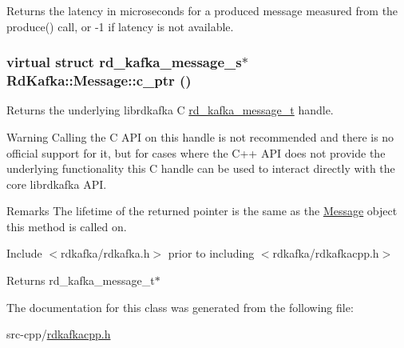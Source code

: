 \label{classRdKafka_1_1Message_a8cce832cbab290d193b028ca3f689b07}
\begin{DoxyReturn}{Returns}
the latency in microseconds for a produced message measured from the produce() call, or -\/1 if latency is not available. 
\end{DoxyReturn}
\hypertarget{classRdKafka_1_1Message_a6add1e2620c7ac4283f150e48cb6e53e}{
\subsubsection[{c\_\-ptr}]{\setlength{\rightskip}{0pt plus 5cm}virtual struct rd\_\-kafka\_\-message\_\-s$\ast$ RdKafka::Message::c\_\-ptr ()}}
\label{classRdKafka_1_1Message_a6add1e2620c7ac4283f150e48cb6e53e}


Returns the underlying librdkafka C \hyperlink{structrd__kafka__message__t}{rd\_\-kafka\_\-message\_\-t} handle. \begin{DoxyWarning}{Warning}
Calling the C API on this handle is not recommended and there is no official support for it, but for cases where the C++ API does not provide the underlying functionality this C handle can be used to interact directly with the core librdkafka API.
\end{DoxyWarning}
\begin{DoxyRemark}{Remarks}
The lifetime of the returned pointer is the same as the \hyperlink{classRdKafka_1_1Message}{Message} object this method is called on.

Include $<$rdkafka/rdkafka.h$>$ prior to including $<$rdkafka/rdkafkacpp.h$>$
\end{DoxyRemark}
\begin{DoxyReturn}{Returns}
{\ttfamily rd\_\-kafka\_\-message\_\-t$\ast$} 
\end{DoxyReturn}


The documentation for this class was generated from the following file:\begin{DoxyCompactItemize}
\item 
src-\/cpp/\hyperlink{rdkafkacpp_8h}{rdkafkacpp.h}\end{DoxyCompactItemize}
